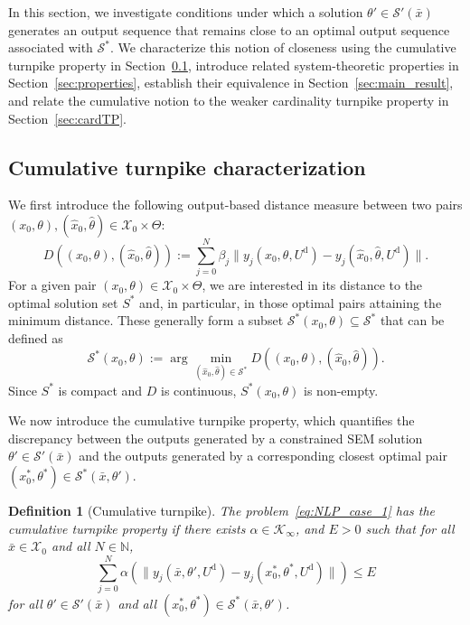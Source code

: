 \documentclass[a4paper,fleqn]{cas-dc}
\newtheorem{defn}{Definition}
\begin{document}
In this section, we investigate conditions under which a solution $\theta'\in\mathcal{S}'(\bar{x})$ generates an output sequence that remains close to an optimal output sequence associated with $\mathcal{S}^*$.
We characterize this notion of closeness using the cumulative turnpike property in Section~\ref{sec:turnpike}, introduce related system-theoretic properties in Section~\ref{sec:properties}, establish their equivalence in Section~\ref{sec:main_result}, and relate the cumulative notion to the weaker cardinality turnpike property in Section~\ref{sec:cardTP}.

\subsection{Cumulative turnpike characterization}\label{sec:turnpike}

We first introduce the following output-based distance measure between two pairs $(x_0,\theta),(\hat{x}_0,\hat{\theta})\in\mathcal{X}_0\times\Theta$:
\begin{equation}\label{eq:J_tilde}
	D(({x}_0,{\theta}),(\hat{x}_0,\hat{\theta})):= \sum_{j=0}^N \beta_j\|y_j({x}_0,{\theta},U^\mathrm{d})-y_j(\hat{x}_0,\hat{\theta},U^\mathrm{d})\|.
\end{equation}
For a given pair $(x_0,\theta)\in\mathcal{X}_0\times\Theta$, we are interested in its distance to the optimal solution set $S^*$ and, in particular, in those optimal pairs attaining the minimum distance. These generally form a subset $\mathcal{S}^*(x_0,\theta)\subseteq \mathcal{S}^*$ that can be defined as
\begin{equation}
	\mathcal{S}^*(x_0,\theta) := \arg\min_{(\hat{x}_0,\hat{\theta})\in\mathcal{S}^*}	D(({x}_0,{\theta}),(\hat{x}_0,\hat{\theta})). \label{eq:set_S0x}
\end{equation}
Since $S^*$ is compact and $D$ is continuous, $S^*(x_0,\theta)$ is non-empty.

We now introduce the cumulative turnpike property, which quantifies the discrepancy between the outputs generated by a constrained SEM solution $\theta'\in\mathcal{S}'(\bar{x})$ and the outputs generated by a corresponding closest optimal pair $(x_0^*,\theta^*)\in\mathcal{S}^*(\bar{x},\theta')$.

\begin{defn}[Cumulative turnpike]\label{def:intTP}
	The problem~\eqref{eq:NLP_case_1} has the \emph{cumulative turnpike property} if there exists $\alpha\in\mathcal{K}_\infty$, and $E>0$ such that for all $\bar{x}\in\mathcal{X}_0$ and all $N\in\mathbb{N}$,
	\begin{equation}\label{eq:intTP}
		\sum_{j=0}^{N}\alpha(\|y_j(\bar{x},\theta',U^\mathrm{d})-y_j(x_0^*,\theta^*,U^\mathrm{d})\|) \leq E
	\end{equation}
	for all $\theta'\in\mathcal{S}'(\bar{x})$ and all $(x_0^*,\theta^*)\in \mathcal{S}^*(\bar{x},\theta')$.
\end{defn}
\end{document}
